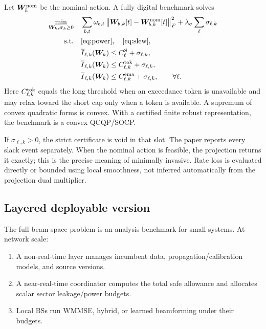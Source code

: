 \documentclass[11pt]{article}
\newcommand{\W}{\bm W}
\newcommand{\norm}[1]{\left\lVert #1\right\rVert}
\begin{document}
Let $\W_k^{\rm nom}$ be the nominal action. A fully digital benchmark solves
\begin{subequations}
\begin{align}
\min_{\W_k,\bm\sigma_k\ge0}\quad
&\sum_{b,t}\omega_{b,t}\norm{\W_{b,k}[t]-\W_{b,k}^{\rm nom}[t]}_F^2
+\lambda_\sigma\sum_\ell\sigma_{\ell,k}\\
\text{s.t.}\quad
&\eqref{eq:power},\quad \eqref{eq:slew},\\
&\overline I_{\ell,k}(\W_k)\le C_\ell^{\rm S}+\sigma_{\ell,k},\\
&\overline I_{\ell,k}(\W_k)\le C_{\ell,k}^{\rm tok}+\sigma_{\ell,k},\\
&\overline I_{\ell,k}(\W_k)\le C_{\ell,k}^{\rm ema}+\sigma_{\ell,k},\qquad\forall\ell.
\end{align}
\label{eq:filter}
\end{subequations}
Here $C_{\ell,k}^{\rm tok}$ equals the long threshold when an exceedance token is unavailable and may relax toward the short cap only when a token is available. A supremum of convex quadratic forms is convex. With a certified finite robust representation, the benchmark is a convex QCQP/SOCP.

If $\sigma_{\ell,k}>0$, the strict certificate is void in that slot. The paper reports every slack event separately. When the nominal action is feasible, the projection returns it exactly; this is the precise meaning of minimally invasive. Rate loss is evaluated directly or bounded using local smoothness, not inferred automatically from the projection dual multiplier.

\subsection{Layered deployable version}

The full beam-space problem is an analysis benchmark for small systems. At network scale:

\begin{enumerate}
\item A non-real-time layer manages incumbent data, propagation/calibration models, and source versions.
\item A near-real-time coordinator computes the total safe allowance and allocates scalar sector leakage/power budgets.
\item Local BSs run WMMSE, hybrid, or learned beamforming under their budgets.
\end{enumerate}
\end{document}
